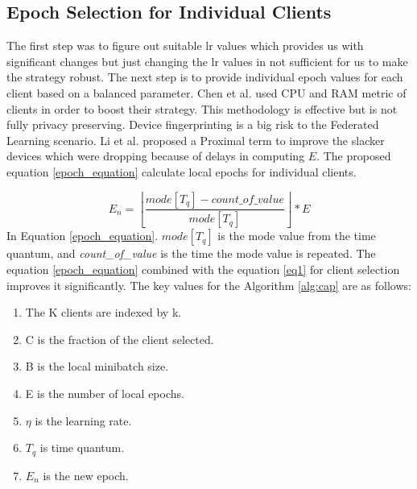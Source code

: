 \documentclass[conference]{IEEEtran}
\begin{document}
\subsection{Epoch Selection for Individual Clients}
The first step was to figure out suitable lr values which provides us with significant changes but just changing the lr values in not sufficient for us to make the strategy robust. The next step is to provide individual epoch values for each client based on a balanced parameter. Chen et al. \cite{chen2023boosting} used CPU and RAM metric of clients in order to boost their strategy. This methodology is effective but is not fully privacy preserving. Device fingerprinting is a big risk to the Federated Learning scenario.  Li et al. \cite{li2020federated} proposed a Proximal term to improve the slacker devices which were dropping because of delays in computing $E$. The proposed equation \ref{epoch_equation} calculate local epochs for individual clients.

\begin{equation}
	E_n = \left \lfloor\frac{mode[T_q] - count\_of\_value}{mode[T_q]}\right \rfloor * E 
	\label{epoch_equation}
\end{equation}
In Equation \ref{epoch_equation}.\textit{ $mode[T_q]$} is the mode value from the time quantum, and \textit{count\_of\_value} is the time the mode value is repeated. The equation \ref{epoch_equation} combined with the equation \ref{eq1} for client selection improves it significantly.
The key values for the Algorithm \ref{alg:cap} are as follows:
\begin{enumerate}
	\item The K clients are indexed by k.
	\item C is the fraction of the client selected.
	\item B is the local minibatch size.
	\item E is the number of local epochs.
	\item $\eta$ is the learning rate.
	\item $T_q$ is time quantum.
	\item $E_n$ is the new epoch.
\end{enumerate}
\end{document}
